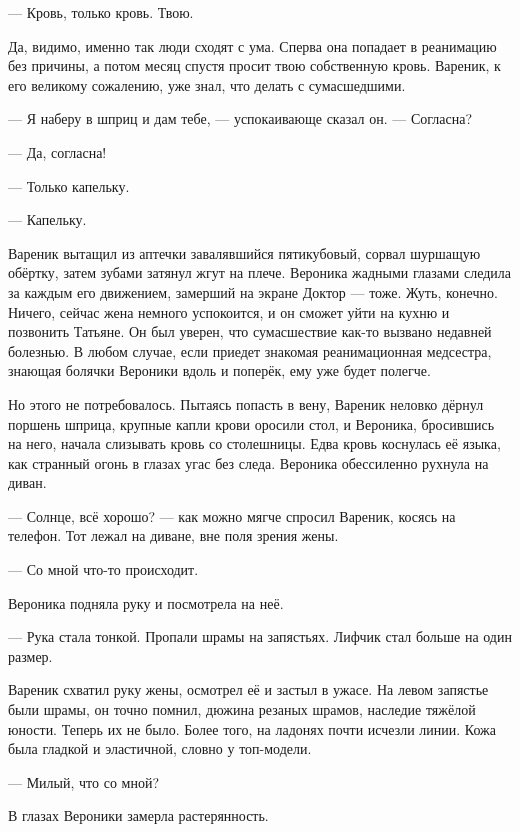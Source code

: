--- Кровь, только кровь.
Твою.

Да, видимо, именно так люди сходят с ума.
Сперва она попадает в реанимацию без причины, а потом месяц спустя просит твою собственную кровь.
Вареник, к его великому сожалению, уже знал, что делать с сумасшедшими.

--- Я наберу в шприц и дам тебе, --- успокаивающе сказал он.
--- Согласна?

--- Да, согласна!

--- Только капельку.

--- Капельку.

Вареник вытащил из аптечки завалявшийся пятикубовый, сорвал шуршащую обёртку, затем зубами затянул жгут на плече.
Вероника жадными глазами следила за каждым его движением, замерший на экране Доктор --- тоже.
Жуть, конечно.
Ничего, сейчас жена немного успокоится, и он сможет уйти на кухню и позвонить Татьяне.
Он был уверен, что сумасшествие как-то вызвано недавней болезнью.
В любом случае, если приедет знакомая реанимационная медсестра, знающая болячки Вероники вдоль и поперёк, ему уже будет полегче.

Но этого не потребовалось.
Пытаясь попасть в вену, Вареник неловко дёрнул поршень шприца, крупные капли крови оросили стол, и Вероника, бросившись на него, начала слизывать кровь со столешницы.
Едва кровь коснулась её языка, как странный огонь в глазах угас без следа.
Вероника обессиленно рухнула на диван.

--- Солнце, всё хорошо? --- как можно мягче спросил Вареник, косясь на телефон.
Тот лежал на диване, вне поля зрения жены.

--- Со мной что-то происходит.

Вероника подняла руку и посмотрела на неё.

--- Рука стала тонкой.
Пропали шрамы на запястьях.
Лифчик стал больше на один размер.

Вареник схватил руку жены, осмотрел её и застыл в ужасе.
На левом запястье были шрамы, он точно помнил, дюжина резаных шрамов, наследие тяжёлой юности.
Теперь их не было.
Более того, на ладонях почти исчезли линии.
Кожа была гладкой и эластичной, словно у топ-модели.

--- Милый, что со мной?

В глазах Вероники замерла растерянность.

\asterism

\textspace


